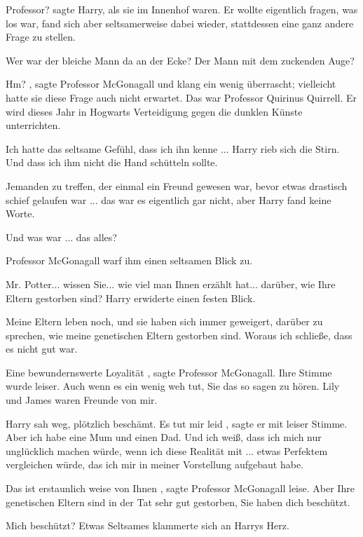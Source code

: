 \glqq Professor?\grqq{} sagte Harry, als sie im Innenhof waren. Er wollte eigentlich fragen, was
los war, fand sich aber seltsamerweise dabei wieder, stattdessen eine ganz andere Frage zu stellen.

\glqq Wer war der bleiche Mann da an der Ecke? Der Mann mit dem zuckenden Auge?\grqq{}

\glqq Hm?\grqq{} , sagte Professor McGonagall und klang ein wenig überrascht; vielleicht hatte sie diese Frage
auch nicht erwartet.
\glqq Das war Professor Quirinus Quirrell. Er wird dieses Jahr in Hogwarts Verteidigung gegen
die dunklen Künste unterrichten.\grqq{}

\glqq Ich hatte das seltsame Gefühl, dass ich ihn kenne ...\grqq{}
Harry rieb sich die Stirn. \glqq Und dass ich ihm nicht die Hand schütteln sollte.\grqq{}

Jemanden zu
treffen, der einmal ein Freund gewesen war, bevor etwas drastisch schief gelaufen war ... das war es eigentlich gar
nicht, aber Harry fand keine Worte.

 \glqq Und was war ... das alles?\grqq{}

Professor McGonagall
warf ihm einen seltsamen Blick zu.

\glqq Mr. Potter... wissen Sie... wie viel man Ihnen erzählt hat...
darüber, wie Ihre Eltern gestorben sind?\grqq{} Harry erwiderte einen festen Blick.

\glqq Meine Eltern leben
noch, und sie haben sich immer geweigert, darüber zu sprechen, wie meine genetischen Eltern gestorben sind. Woraus ich
schließe, dass es nicht gut war.\grqq{}

\glqq Eine bewundernswerte Loyalität\grqq{} , sagte Professor
McGonagall. Ihre Stimme wurde leiser. \glqq Auch wenn es ein wenig weh tut, Sie das so sagen zu hören. Lily und James
waren Freunde von mir.\grqq{}

Harry sah weg, plötzlich beschämt. \glqq Es tut mir leid\grqq{} , sagte er mit
leiser Stimme. \glqq Aber ich habe eine Mum und einen Dad. Und ich weiß, dass ich mich nur unglücklich machen würde,
wenn ich diese Realität mit ... etwas Perfektem vergleichen würde, das ich mir in meiner Vorstellung aufgebaut
habe.\grqq{}

\glqq Das ist erstaunlich weise von Ihnen\grqq{} , sagte Professor McGonagall leise. \glqq Aber
Ihre genetischen Eltern sind in der Tat sehr gut gestorben, Sie haben dich beschützt.\grqq{}

Mich beschützt?
Etwas Seltsames klammerte sich an Harrys Herz.

